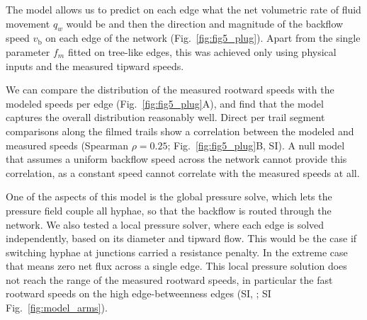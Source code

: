 The model allows us to predict on each edge what the net volumetric rate of fluid movement $q_w$ would be and then the direction and magnitude of the backflow speed $v_\mathrm{b}$ on each edge of the network (Fig.~\ref{fig:fig5_plug}). Apart from the single parameter $f_m$ fitted on tree-like edges, this was achieved only using physical inputs and the measured tipward speeds.

We can compare the distribution of the measured rootward speeds with the modeled speeds per edge (Fig.~\ref{fig:fig5_plug}A), and find that the model captures the overall distribution reasonably well.
Direct per trail segment comparisons along the filmed trails show a correlation between the modeled and measured speeds (Spearman $\rho = 0.25$; Fig.~\ref{fig:fig5_plug}B, SI).
A null model that assumes a uniform backflow speed across the network cannot provide this correlation, as a constant speed cannot correlate with the measured speeds at all.

One of the aspects of this model is the global pressure solve, which lets the pressure field couple all hyphae, so that the backflow is routed through the network.
We also tested a local pressure solver, where each edge is solved independently, based on its diameter and tipward flow.
This would be the case if switching hyphae at junctions carried a resistance penalty. In the extreme case that means zero net flux across a single edge.
This local pressure solution does not reach the range of the measured rootward speeds, in particular the fast rootward speeds on the high edge-betweenness edges (SI, ; SI Fig.~\ref{fig:model_arms}). 

